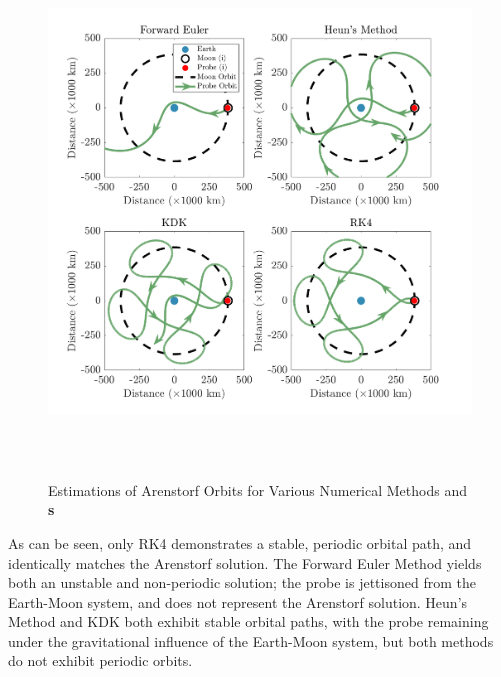 \documentclass[conf]{new-aiaa}
\begin{document}
    \begin{figure}[H]
        \centering
        \includegraphics[height = 14cm]{Figures/Arenstorf/Arenstorf.png}
        \caption{Estimations of Arenstorf Orbits for Various Numerical Methods and  \textbf{ s}}
        \label{Aren}
    \end{figure}
    As can be seen, only RK4 demonstrates a stable, periodic orbital path, and identically matches the Arenstorf solution. The Forward Euler Method yields both an unstable and non-periodic solution; the probe is jettisoned from the Earth-Moon system, and does not represent the Arenstorf solution. Heun's Method and KDK both exhibit stable orbital paths, with the probe remaining under the gravitational influence of the Earth-Moon system, but both methods do not exhibit periodic orbits.
\end{document}
